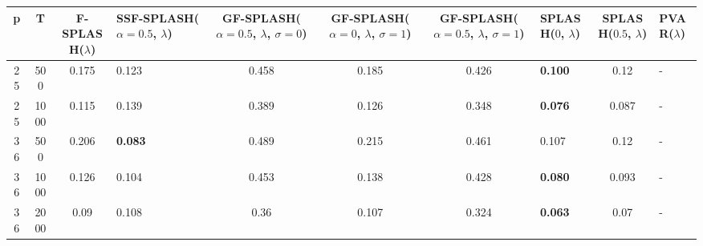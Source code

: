 \begin{tabular}{ccclccclcl}
\hline
  p  &  T   &  F-SPLASH($\lambda$)  & SSF-SPLASH($\alpha=0.5$, $\lambda$)   &  GF-SPLASH($\alpha=0.5$, $\lambda$, $\sigma=0$)  &  GF-SPLASH($\alpha=0$, $\lambda$, $\sigma=1$)  &  GF-SPLASH($\alpha=0.5$, $\lambda$, $\sigma=1$)  & SPLASH($0$, $\lambda$)   &  SPLASH($0.5$, $\lambda$)  & PVAR($\lambda$)   \\
\hline
 25  & 500  &         0.175         & 0.123                                 &                      0.458                       &                     0.185                      &                      0.426                       & \textbf{0.100}           &            0.12            & -                 \\
 25  & 1000 &         0.115         & 0.139                                 &                      0.389                       &                     0.126                      &                      0.348                       & \textbf{0.076}           &           0.087            & -                 \\
 36  & 500  &         0.206         & \textbf{0.083}                        &                      0.489                       &                     0.215                      &                      0.461                       & 0.107                    &            0.12            & -                 \\
 36  & 1000 &         0.126         & 0.104                                 &                      0.453                       &                     0.138                      &                      0.428                       & \textbf{0.080}           &           0.093            & -                 \\
 36  & 2000 &         0.09          & 0.108                                 &                       0.36                       &                     0.107                      &                      0.324                       & \textbf{0.063}           &            0.07            & -                 \\
\hline
\end{tabular}